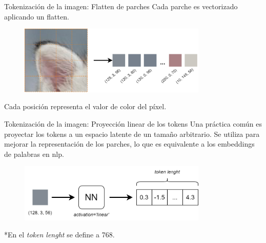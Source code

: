 \begin{frame}{Tokenización de la imagen: Flatten de parches}
Cada parche es \alert{vectorizado} aplicando un flatten.

\begin{figure}
    \centering
    \includegraphics[width=0.8\textwidth]{Slides/figures/Vision_Transformers/Patch_Flatten.png}
\end{figure}

Cada posición representa el valor de color del píxel.
\end{frame}

\begin{frame}{Tokenización de la imagen: Proyección linear de los tokens}
Una práctica común es proyectar los tokens a un espacio latente de un tamaño arbitrario. Se utiliza para mejorar la \alert{representación de los parches}, lo que es equivalente a los \alert{embeddings de palabras} en \gls{nlp}. 

\begin{figure}
    \centering
    \includegraphics[width=0.8\textwidth]{Slides/figures/Vision_Transformers/Token_Projection.png}
\end{figure}

*En \cite{dosovitskiy2020image} el \textit{token lenght} se define a 768.
\end{frame}

